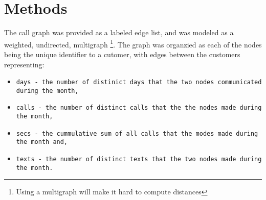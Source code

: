 \section{Methods}
The call graph was provided as a labeled edge list, and was modeled as a weighted, undirected, multigraph \footnote{Using a multigraph will make it hard to compute distances}.
The graph was organzied as each of the nodes being the unique identifier to a cutomer, with edges between the customers representing:
\begin{itemize}
	\item \tt{days} - the number of distinict days that the two nodes communicated during the month,
	\item \tt{calls} - the number of distinct calls that the the nodes made during the month,
	\item \tt{secs} - the cummulative sum of all calls that the modes made during the month and,
	\item \tt{texts} - the number of distinct texts that the two nodes made during the month.
\end{itemize}

